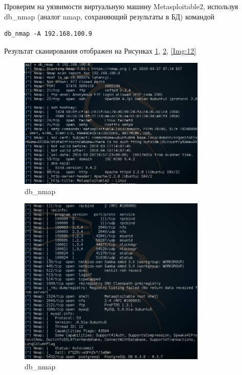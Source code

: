 \documentclass[10pt,a4paper]{report}
\begin{document}
Проверим на уязвимости виртуальную машину Metasploitable2, используя db\_nmap (аналог nmap, сохраняющий результаты в БД) командой

\begin{verbatim}
db_nmap -A 192.168.100.9
\end{verbatim}

Результат сканирования отображен на Рисунках \ref{Img:10}, \ref{Img:11}, \ref{Img:12}

\begin{figure}[h]
	\begin{center}
		\includegraphics[width=0.8\textwidth]{Img/10}
		\caption{db\_nmap}
		\label{Img:10}
	\end{center}
\end{figure}

\begin{figure}[h]
	\begin{center}
		\includegraphics[width=0.8\textwidth]{Img/11}
		\caption{db\_nmap}
		\label{Img:11}
	\end{center}
\end{figure}
\end{document}
